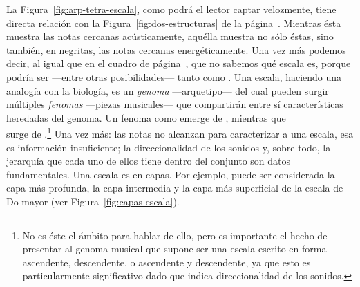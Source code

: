 \documentclass[a4paper,12pt]{article}
\begin{document}
\begin{multicols}{2}
  La Figura~\ref{fig:arp-tetra-escala}, como podrá el lector captar velozmente, tiene directa relación con la Figura~\ref{fig:dos-estructuras} de la página~\pageref{fig:dos-estructuras}. Mientras ésta muestra las notas cercanas acústicamente, aquélla muestra no sólo éstas, sino también, en negritas, las notas cercanas energéticamente. Una vez más podemos decir, al igual que en el cuadro de página~\pageref{caja:notacion-escalas}, que  no sabemos qué escala es, porque podría ser ---entre otras posibilidades--- tanto  como \hbox{.} Una escala, haciendo una analogía con la biología, es un \emph{genoma} ---arquetipo--- del cual pueden surgir múltiples \emph{fenomas} ---piezas musicales--- que compartirán entre sí características heredadas del genoma. Un fenoma como  emerge de \hbox{,} mientras que \\
   surge de \hbox{.}\footnote{No es éste el ámbito para hablar de ello, pero es importante el hecho de presentar al genoma musical que supone ser una escala escrito en forma ascendente, descendente, o ascendente y descendente, ya que esto es particularmente significativo dado que indica direccionalidad de los sonidos.} Una vez más: las notas no alcanzan para caracterizar a una escala, esa es información insuficiente; la direccionalidad de los sonidos y, sobre todo, la jerarquía que cada uno de ellos tiene dentro del conjunto son datos fundamentales. Una escala es en capas. Por ejemplo,  puede ser considerada la capa más profunda,  la capa intermedia y  la capa más superficial de la escala de Do mayor (ver Figura~\ref{fig:capas-escala}).
\end{multicols}
\end{document}
